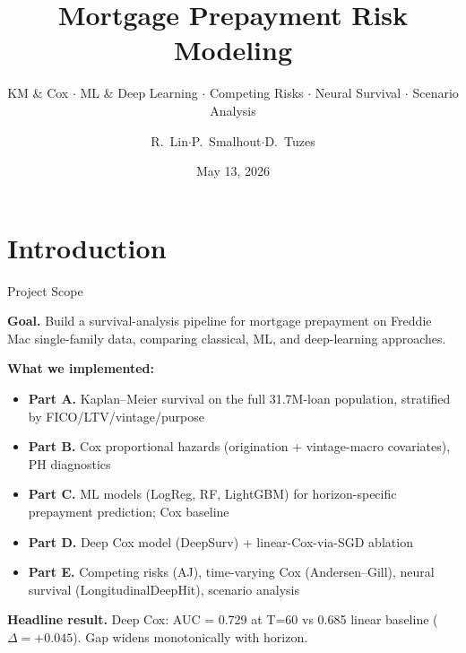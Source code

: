 \documentclass[10pt,aspectratio=169]{beamer}
\title{Mortgage Prepayment Risk Modeling}
\subtitle{KM \& Cox $\cdot$ ML \& Deep Learning $\cdot$ Competing Risks $\cdot$ Neural Survival $\cdot$ Scenario Analysis}
\author{R.\ Lin\enspace$\cdot$\enspace P.\ Smalhout\enspace$\cdot$\enspace D.\ Tuzes}
\date{May 13, 2026}
\begin{document}
\begin{frame}[plain]
    \titlepage
\end{frame}

\section{Introduction}

\begin{frame}{Project Scope}

    \textbf{Goal.} Build a survival-analysis pipeline for mortgage prepayment on Freddie Mac single-family data, comparing classical, ML, and deep-learning approaches.

    \vspace{0.5em}

    \textbf{What we implemented:}
    \begin{itemize}\itemsep2pt
        \item \textbf{Part A.} Kaplan--Meier survival on the full 31.7M-loan population, stratified by FICO/LTV/vintage/purpose
        \item \textbf{Part B.} Cox proportional hazards (origination + vintage-macro covariates), PH diagnostics
        \item \textbf{Part C.} ML models (LogReg, RF, LightGBM) for horizon-specific prepayment prediction; Cox baseline
        \item \textbf{Part D.} Deep Cox model (DeepSurv) + linear-Cox-via-SGD ablation
        \item \textbf{Part E.} Competing risks (AJ), time-varying Cox (Andersen--Gill), neural survival (LongitudinalDeepHit), scenario analysis
    \end{itemize}

    \vspace{0.5em}

    \textbf{Headline result.} Deep Cox: AUC = 0.729 at T=60 vs 0.685 linear baseline ($\Delta=+0.045$). Gap widens monotonically with horizon.

\end{frame}
\end{document}
